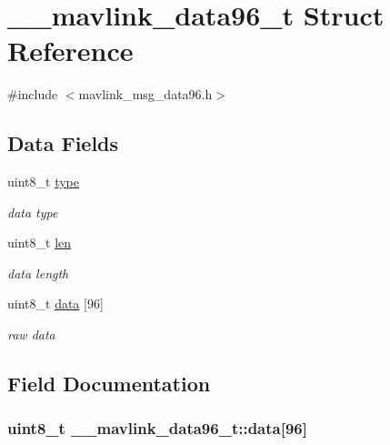\hypertarget{struct____mavlink__data96__t}{\section{\+\_\+\+\_\+mavlink\+\_\+data96\+\_\+t Struct Reference}
\label{struct____mavlink__data96__t}
}


{\ttfamily \#include $<$mavlink\+\_\+msg\+\_\+data96.\+h$>$}

\subsection*{Data Fields}
\begin{DoxyCompactItemize}
\item 
uint8\+\_\+t \hyperlink{struct____mavlink__data96__t_aad6f12d8b87e172531fa5f6827acc769}{type}
\begin{DoxyCompactList}\small\item\em data type \end{DoxyCompactList}\item 
uint8\+\_\+t \hyperlink{struct____mavlink__data96__t_a2afda58f4d9420c31003cf3474e5c271}{len}
\begin{DoxyCompactList}\small\item\em data length \end{DoxyCompactList}\item 
uint8\+\_\+t \hyperlink{struct____mavlink__data96__t_a980d1eef58f7261ad01052bc2f78e605}{data} \mbox{[}96\mbox{]}
\begin{DoxyCompactList}\small\item\em raw data \end{DoxyCompactList}\end{DoxyCompactItemize}


\subsection{Field Documentation}
\hypertarget{struct____mavlink__data96__t_a980d1eef58f7261ad01052bc2f78e605}{
\subsubsection[{data}]{\setlength{\rightskip}{0pt plus 5cm}uint8\+\_\+t \+\_\+\+\_\+mavlink\+\_\+data96\+\_\+t\+::data\mbox{[}96\mbox{]}}}\label{struct____mavlink__data96__t_a980d1eef58f7261ad01052bc2f78e605}


